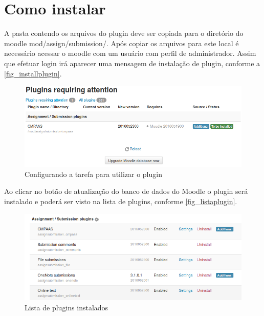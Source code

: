\documentclass[
	12pt,				%
	openright,			%
	oneside,			%
	a4paper,			%
	english,			%
	french,				%
	spanish,			%
	brazil				%
	]{abntex2}
\begin{document}
\section{Como instalar}
A pasta contendo os arquivos do plugin deve ser copiada para o diretório do moodle mod/assign/submission/. Após copiar os arquivos para este local é necessário acessar o moodle com um usuário com perfil de administrador. Assim que efetuar login irá aparecer uma mensagem de instalação de plugin, conforme a \autoref{fig_installplugin}.
\begin{figure}[htb]
	\caption{\label{fig_installplugin} Configurando a tarefa para utilizar o plugin}
	\begin{center}
		\includegraphics[scale=0.4]{installplugin.png}
	\end{center}
\end{figure}

Ao clicar no botão de atualização do banco de dados do Moodle o plugin será instalado e poderá ser visto na lista de plugins, conforme \autoref{fig_listaplugin}.

\begin{figure}[htb]
	\caption{\label{fig_listaplugin} Lista de plugins instalados}
	\begin{center}
		\includegraphics[scale=0.4]{listaplugin.png}
	\end{center}
\end{figure}
\end{document}
